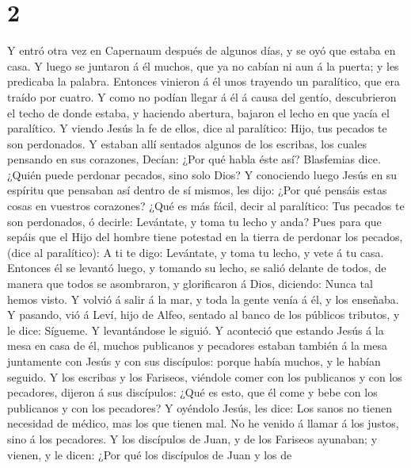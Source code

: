 \hypertarget{section-1}{%
\section{2}\label{section-1}}

 Y entró otra vez en Capernaum después de algunos días, y se
oyó que estaba en casa.  Y luego se juntaron á él muchos,
que ya no cabían ni aun á la puerta; y les predicaba la palabra.
 Entonces vinieron á él unos trayendo un paralítico, que era
traído por cuatro.  Y como no podían llegar á él á causa del
gentío, descubrieron el techo de donde estaba, y haciendo abertura,
bajaron el lecho en que yacía el paralítico.  Y viendo Jesús
la fe de ellos, dice al paralítico: Hijo, tus pecados te son perdonados.
 Y estaban allí sentados algunos de los escribas, los cuales
pensando en sus corazones,  Decían: ¿Por qué habla éste así?
Blasfemias dice. ¿Quién puede perdonar pecados, sino solo Dios?
 Y conociendo luego Jesús en su espíritu que pensaban así
dentro de sí mismos, les dijo: ¿Por qué pensáis estas cosas en vuestros
corazones?  ¿Qué es más fácil, decir al paralítico: Tus
pecados te son perdonados, ó decirle: Levántate, y toma tu lecho y anda?
 Pues para que sepáis que el Hijo del hombre tiene potestad
en la tierra de perdonar los pecados, (dice al paralítico):
 A ti te digo: Levántate, y toma tu lecho, y vete á tu
casa.  Entonces él se levantó luego, y tomando su lecho, se
salió delante de todos, de manera que todos se asombraron, y
glorificaron á Dios, diciendo: Nunca tal hemos visto.  Y
volvió á salir á la mar, y toda la gente venía á él, y los enseñaba.
 Y pasando, vió á Leví, hijo de Alfeo, sentado al banco de
los públicos tributos, y le dice: Sígueme. Y levantándose le siguió.
 Y aconteció que estando Jesús á la mesa en casa de él,
muchos publicanos y pecadores estaban también á la mesa juntamente con
Jesús y con sus discípulos: porque había muchos, y le habían seguido.
 Y los escribas y los Fariseos, viéndole comer con los
publicanos y con los pecadores, dijeron á sus discípulos: ¿Qué es esto,
que él come y bebe con los publicanos y con los pecadores? 
Y oyéndolo Jesús, les dice: Los sanos no tienen necesidad de médico, mas
los que tienen mal. No he venido á llamar á los justos, sino á los
pecadores.  Y los discípulos de Juan, y de los Fariseos
ayunaban; y vienen, y le dicen: ¿Por qué los discípulos de Juan y los de

